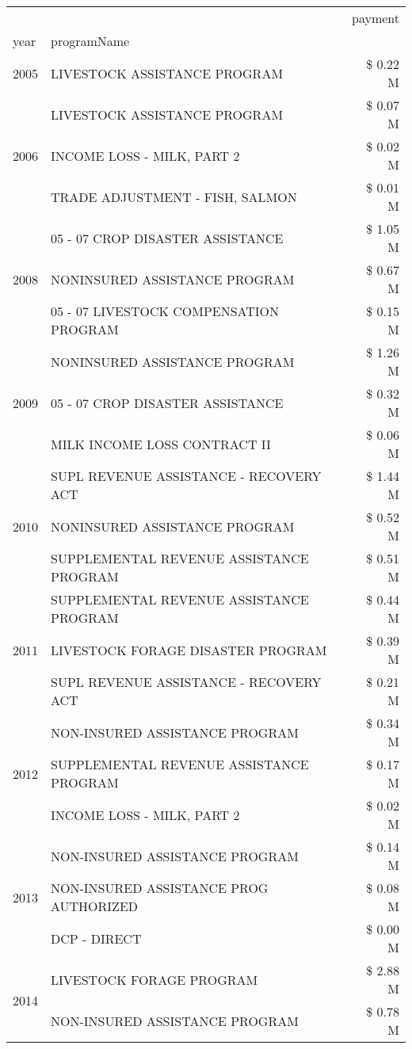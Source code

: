 \begin{tabular}{llr}
\toprule
 &  & payment \\
year & programName &  \\
\midrule
2005 & LIVESTOCK ASSISTANCE PROGRAM & \$ 0.22 M \\
\cline{1-3}
\multirow[t]{3}{*}{2006} & LIVESTOCK ASSISTANCE PROGRAM & \$ 0.07 M \\
 & INCOME LOSS - MILK, PART 2 & \$ 0.02 M \\
 & TRADE ADJUSTMENT - FISH, SALMON & \$ 0.01 M \\
\cline{1-3}
\multirow[t]{3}{*}{2008} & 05 - 07 CROP DISASTER ASSISTANCE & \$ 1.05 M \\
 & NONINSURED ASSISTANCE PROGRAM & \$ 0.67 M \\
 & 05 - 07 LIVESTOCK COMPENSATION PROGRAM & \$ 0.15 M \\
\cline{1-3}
\multirow[t]{3}{*}{2009} & NONINSURED ASSISTANCE PROGRAM & \$ 1.26 M \\
 & 05 - 07 CROP DISASTER ASSISTANCE & \$ 0.32 M \\
 & MILK INCOME LOSS CONTRACT II & \$ 0.06 M \\
\cline{1-3}
\multirow[t]{3}{*}{2010} & SUPL REVENUE ASSISTANCE - RECOVERY ACT & \$ 1.44 M \\
 & NONINSURED ASSISTANCE PROGRAM & \$ 0.52 M \\
 & SUPPLEMENTAL REVENUE ASSISTANCE PROGRAM & \$ 0.51 M \\
\cline{1-3}
\multirow[t]{3}{*}{2011} & SUPPLEMENTAL REVENUE ASSISTANCE PROGRAM & \$ 0.44 M \\
 & LIVESTOCK FORAGE DISASTER PROGRAM & \$ 0.39 M \\
 & SUPL REVENUE ASSISTANCE - RECOVERY ACT & \$ 0.21 M \\
\cline{1-3}
\multirow[t]{3}{*}{2012} & NON-INSURED ASSISTANCE PROGRAM & \$ 0.34 M \\
 & SUPPLEMENTAL REVENUE ASSISTANCE PROGRAM & \$ 0.17 M \\
 & INCOME LOSS - MILK, PART 2 & \$ 0.02 M \\
\cline{1-3}
\multirow[t]{3}{*}{2013} & NON-INSURED ASSISTANCE PROGRAM & \$ 0.14 M \\
 & NON-INSURED ASSISTANCE PROG AUTHORIZED & \$ 0.08 M \\
 & DCP - DIRECT & \$ 0.00 M \\
\cline{1-3}
\multirow[t]{3}{*}{2014} & LIVESTOCK FORAGE PROGRAM & \$ 2.88 M \\
 & NON-INSURED ASSISTANCE PROGRAM & \$ 0.78 M \\

\end{tabular}

